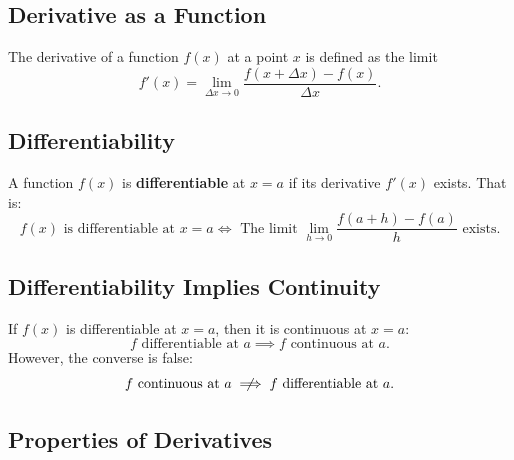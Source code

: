 \documentclass[a4paper,11pt]{article}
\begin{document}


\subsection{Derivative as a Function}

\begin{tcolorbox}
    The derivative of a function $f(x)$ at a point $x$ is defined as the limit
    \[
    f'(x) = \lim_{\Delta x \to 0} \frac{f(x + \Delta x) - f(x)}{\Delta x}.
    \]
\end{tcolorbox}




\subsection{Differentiability}

\begin{tcolorbox}
    A function \( f(x) \) is \textbf{differentiable} at \( x = a \) if its derivative \( f'(x) \) exists. That is:  
    \[
    f(x) \text{ is differentiable at } x = a \iff \text{ The limit } \lim\limits_{h \to 0} \frac{f(a+h) - f(a)}{h} \text{ exists.}
    \]
\end{tcolorbox}




\subsection{Differentiability Implies Continuity}

\begin{tcolorbox}
    If \( f(x) \) is differentiable at \( x = a \), then it is continuous at \( x = a: \)
    \[
    f \text{ differentiable at } a \implies f \text{ continuous at } a.
    \]
    However, the converse is false:
    \[
    f \text{ continuous at } a \centernot\implies f \text{ differentiable at } a.
    \]
\end{tcolorbox}




\subsection{Properties of Derivatives}
\end{document}
